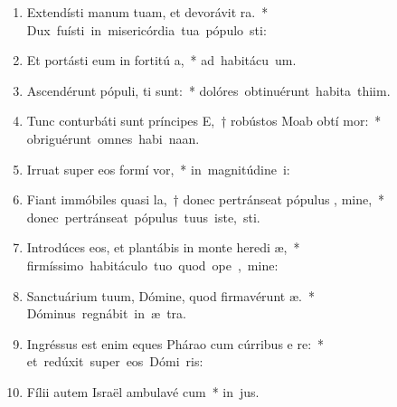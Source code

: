 \begin{flushleft}
\begin{enumerate}[leftmargin=*]
\item Extendísti manum tuam, et devorávit  ra.~* \mbox{Dux fuísti in misericórdia tua pópulo  sti:}
\item Et portásti eum in fortitú a,~* \mbox{ad habitácu  um.}
\item Ascendérunt pópuli,  ti sunt:~* \mbox{dolóres obtinuérunt habita thiim.}
\item Tunc conturbáti sunt príncipes E,~† robústos Moab obtí mor:~* \mbox{obriguérunt omnes habi naan.}
\item Irruat super eos formí  vor,~* \mbox{in magnitúdine  i:}
\item Fiant immóbiles quasi la,~† donec pertránseat pópulus , mine,~* \mbox{donec pertránseat pópulus tuus iste,  sti.}
\item Introdúces eos, et plantábis in monte heredi æ,~* \mbox{firmíssimo habitáculo tuo quod ope , mine:}
\item Sanctuárium tuum, Dómine, quod firmavérunt  æ.~* \mbox{Dóminus regnábit in æ  tra.}
\item Ingréssus est enim eques Phárao cum cúrribus %
e  re:~* \mbox{et redúxit super eos Dómi  ris:}
\item Fílii autem Israël ambulavé  cum~* \mbox{in  jus.}




\end{enumerate}
\end{flushleft}

